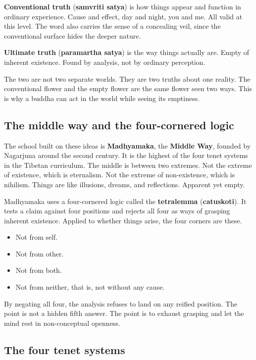 \textbf{Conventional truth} (\textbf{samvriti satya}) is how things appear and function in ordinary experience. Cause and effect, day and night, you and me. All valid at this level. The word also carries the sense of a concealing veil, since the conventional surface hides the deeper nature.

\textbf{Ultimate truth} (\textbf{paramartha satya}) is the way things actually are. Empty of inherent existence. Found by analysis, not by ordinary perception.

The two are not two separate worlds. They are two truths about one reality. The conventional flower and the empty flower are the same flower seen two ways. This is why a buddha can act in the world while seeing its emptiness.

\subsection*{The middle way and the four-cornered logic}

The school built on these ideas is \textbf{Madhyamaka}, the \textbf{Middle Way}, founded by Nagarjuna around the second century. It is the highest of the four tenet systems in the Tibetan curriculum. The middle is between two extremes. Not the extreme of existence, which is eternalism. Not the extreme of non-existence, which is nihilism. Things are like illusions, dreams, and reflections. Apparent yet empty.

Madhyamaka uses a four-cornered logic called the \textbf{tetralemma} (\textbf{catuskoti}). It tests a claim against four positions and rejects all four as ways of grasping inherent existence. Applied to whether things arise, the four corners are these.

\begin{itemize}
 \item Not from self.
 \item Not from other.
 \item Not from both.
 \item Not from neither, that is, not without any cause.
\end{itemize}

By negating all four, the analysis refuses to land on any reified position. The point is not a hidden fifth answer. The point is to exhaust grasping and let the mind rest in non-conceptual openness.

\subsection*{The four tenet systems}

